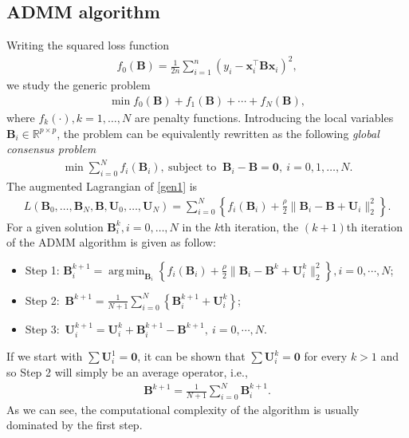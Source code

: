 \documentclass[preprint,authoryear,11pt]{elsarticle}
\def\mR{\mathbb{R}}
\newcommand{\B}{\mathbf B}
\newcommand{\x}{\mathbf x}
\newcommand{\bU}{\mathbf U}
\newcommand{\trans}{^\top}
\DeclareMathOperator*{\argmin}{arg\,min} %
\begin{document}
\subsection{ADMM algorithm}
Writing the squared loss function
\begin{align*}
	f_0(\B)=\frac{1}{2n} \sum_{i=1}^n (y_i-\x_i \trans \B \x_i)^2, 
\end{align*}
we study the generic problem 
\begin{align*}
	\min f_0(\B)+f_1(\B)+\cdots+f_N(\B),
\end{align*}
where $f_k(\cdot),k=1,\ldots,N$ are penalty functions. Introducing the local variables $\B_i \in \mR^{p \times p}$, %
the problem can be equivalently rewritten as the following \textit{global consensus problem} \citep[Section 7]{boyd2011distributed}
\begin{align} \label{gen1}
	\min \sum_{i=0}^N f_i(\B_i),~\mbox{subject~to~}~\B_i-\B=\mathbf{0},~i=0,1,\ldots, N.
\end{align} 
The augmented Lagrangian of \eqref{gen1} is
\begin{align*}
L(\B_0,\ldots,\B_N, \B, \bU_0,\ldots,\bU_N)=\sum_{i=0}^N \left\{f_i(\B_i)+ \frac{\rho}{2} \|\B_i-\B+\bU_i\|^2_2   \right\}.
\end{align*}
For a given solution $\B_i^{k}, i=0,\ldots, N$ in the $k$th iteration, 
the $(k+1)$th iteration of the ADMM algorithm is given as follow:
\begin{itemize}
 \item Step 1:  	$\B^{k+1}_i=\argmin_{\B_i} \left\{f_i(\B_i)+ \frac{\rho}{2} { \|\B_i-\B^k+\bU^k_i\|^2_2 }   \right\},     i=0,\cdots,N$;  
	\item Step 2:~$\B^{k+1}=\frac{1}{N+1}\sum_{i=0}^N \left\{ \B^{k+1}_i+\bU^k_i \right\}$;
	\item Step 3:~$\bU_i^{k+1}=\bU_i^k+\B_i^{k+1}-\B^{k+1},~i=0,\cdots,N$.
\end{itemize}
If we start with $\sum \bU^1_i=\mathbf{0}$, it can be shown that $\sum \bU^k_i=\mathbf{0}$ for every $k>1$ and so Step 2 will simply be an average operator, i.e.,
\begin{align*}
	\B^{k+1}=\frac{1}{N+1}\sum_{i=0}^N \B^{k+1}_i.
\end{align*}
 As we can see, the computational complexity of the algorithm is usually dominated by the first step. 
\end{document}
